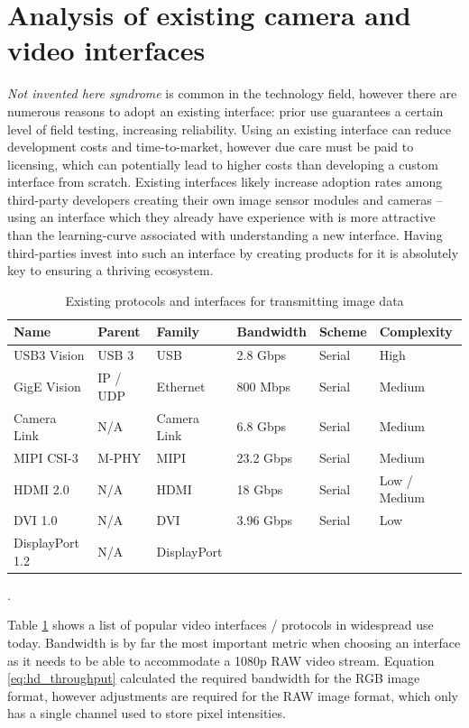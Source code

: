 \section{Analysis of existing camera and video interfaces}
\textit{Not invented here syndrome} is common in the technology field, however there are numerous reasons to adopt an existing interface: prior use guarantees a certain level of field testing, increasing reliability. Using an existing interface can reduce development costs and time-to-market, however due care must be paid to licensing, which can potentially lead to higher costs than developing a custom interface from scratch. Existing interfaces likely increase adoption rates among third-party developers creating their own image sensor modules and cameras – using an interface which they already have experience with is more attractive than the learning-curve associated with understanding a new interface. Having third-parties invest into such an interface by creating products for it is absolutely key to ensuring a thriving ecosystem.

\begin{table}
  \centering
  \begin{tabular}{llllll}
  Name      & Parent  & Family    & Bandwidth & Scheme  & Complexity \\
  \hline
  USB3 Vision   & USB 3   & USB       & 2.8 Gbps  & Serial  & High \\
  GigE Vision   & IP / UDP  & Ethernet    & 800 Mbps  & Serial  & Medium \\
  Camera Link   & N/A     & Camera Link   & 6.8 Gbps  & Serial  & Medium \\
  MIPI CSI-3  & M-PHY   & MIPI      & 23.2 Gbps & Serial  & Medium \\
  HDMI 2.0    & N/A     & HDMI      & 18 Gbps   & Serial  & Low / Medium \\
  DVI 1.0     & N/A     & DVI       & 3.96 Gbps & Serial  & Low \\
  DisplayPort 1.2 & N/A   & DisplayPort   & 
  \end{tabular}
  \caption{Existing protocols and interfaces for transmitting image data      \protect\cite{16_von_fintel_2013,17_arrowdevices.com_2014,18_hdmi.org}}.
  \label{table:existing_protocols}
\end{table}

Table \ref{table:existing_protocols} shows a list of popular video interfaces / protocols in widespread use today. Bandwidth is by far the most important metric when choosing an interface as it needs to be able to accommodate a 1080p RAW video stream. Equation \ref{eq:hd_throughput} calculated the required bandwidth for the RGB image format, however adjustments are required for the RAW image format, which only has a single channel used to store pixel intensities. 

